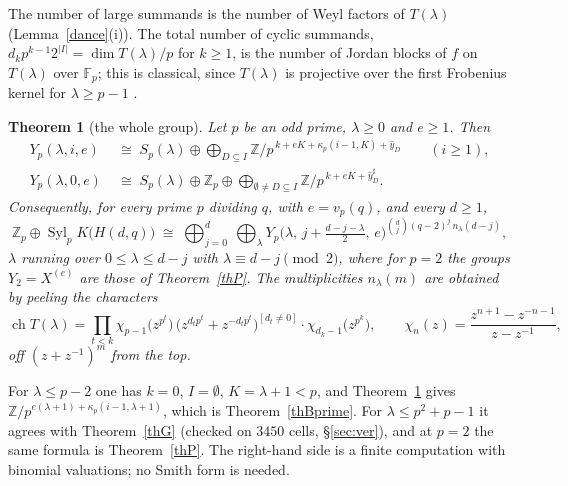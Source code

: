 \documentclass[10pt]{article}
\theoremstyle{ds}
\newtheorem{theorem}{Theorem}
\theoremstyle{dsrem}
\newcommand{\Z}{\mathbb{Z}}
\newcommand{\F}{\mathbb{F}}
\newcommand{\Syl}{\operatorname{Syl}}
\begin{document}
The number of large summands is the number of Weyl factors of $T(\lambda)$ (Lemma~\ref{dance}(i)). The total number of cyclic summands, $d_kp^{k-1}2^{|I|}=\dim T(\lambda)/p$ for $k\ge1$, is the number of Jordan blocks of $f$ on $T(\lambda)$ over $\F_p$; this is classical, since $T(\lambda)$ is projective over the first Frobenius kernel for $\lambda\ge p-1$ \cite[II.11.11]{Jan}.

\begin{mdframed}[style=headline]
\begin{theorem}[the whole group]\label{thJ}
Let $p$ be an odd prime, $\lambda\ge0$ and $e\ge1$. Then
\begin{align*}
Y_p(\lambda,i,e)&\;\cong\;S_p(\lambda)\oplus\bigoplus_{D\subseteq I}\Z/p^{\,k+eK+\kappa_p(i-1,K)+\hat y_D}\qquad(i\ge1),\\
Y_p(\lambda,0,e)&\;\cong\;S_p(\lambda)\oplus\Z_p\oplus\bigoplus_{\emptyset\ne D\subseteq I}\Z/p^{\,k+eK+\hat y^\sharp_D}.
\end{align*}
Consequently, for every prime $p$ dividing $q$, with $e=v_p(q)$, and every $d\ge1$,
\[
\Z_p\oplus\Syl_pK\big(H(d,q)\big)\;\cong\;\bigoplus_{j=0}^{d}\ \bigoplus_{\lambda}Y_p\big(\lambda,\,j+\tfrac{d-j-\lambda}{2},\,e\big)^{\binom dj(q-2)^j\,n_\lambda(d-j)},
\]
$\lambda$ running over $0\le\lambda\le d-j$ with $\lambda\equiv d-j\pmod2$, where for $p=2$ the groups $Y_2=X^{(e)}$ are those of Theorem~\ref{thP}. The multiplicities $n_\lambda(m)$ are obtained by peeling the characters
\[
\operatorname{ch}T(\lambda)=\prod_{t<k}\chi_{p-1}\big(z^{p^t}\big)\,\big(z^{d_tp^t}+z^{-d_tp^t}\big)^{[d_t\ne0]}\cdot\chi_{d_k-1}\big(z^{p^k}\big),\qquad \chi_n(z)=\frac{z^{n+1}-z^{-n-1}}{z-z^{-1}},
\]
off $(z+z^{-1})^m$ from the top.
\end{theorem}
\end{mdframed}

For $\lambda\le p-2$ one has $k=0$, $I=\emptyset$, $K=\lambda+1<p$, and Theorem~\ref{thJ} gives $\Z/p^{e(\lambda+1)+\kappa_p(i-1,\lambda+1)}$, which is Theorem~\ref{thBprime}. For $\lambda\le p^2+p-1$ it agrees with Theorem~\ref{thG} (checked on $3450$ cells, \S\ref{sec:ver}), and at $p=2$ the same formula is Theorem~\ref{thP}. The right-hand side is a finite computation with binomial valuations; no Smith form is needed.
\end{document}
